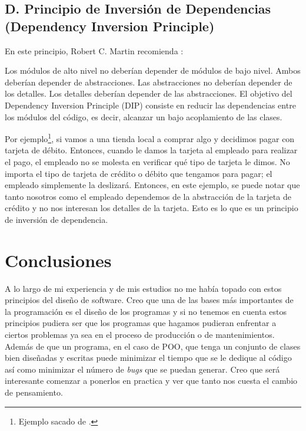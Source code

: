 \documentclass[12pt, oneside]{article}
\begin{document}
\subsection*{D. Principio de Inversión de Dependencias (Dependency Inversion Principle)}

\cite{martin2000design}

En este principio, Robert C. Martin recomienda\cite{singh2015effect} :

Los módulos de alto nivel no deberían depender de módulos de bajo nivel. Ambos deberían depender de abstracciones.
Las abstracciones no deberían depender de los detalles. Los detalles deberían depender de las abstracciones.
El objetivo del Dependency Inversion Principle (DIP) consiste en reducir las dependencias entre los módulos del código, es decir, alcanzar un bajo acoplamiento de las clases.

Por ejemplo\footnote{Ejemplo sacado de \cite{ejemplo_d}.}, si vamos a una tienda local a comprar algo y decidimos pagar con tarjeta de débito. Entonces, cuando le damos la tarjeta al empleado para realizar el pago, el empleado no se molesta en verificar qué tipo de tarjeta le dimos.
No importa el tipo de tarjeta de crédito o débito que tengamos para pagar; el empleado simplemente la deslizará. Entonces, en este ejemplo, se puede notar que tanto nosotros como el empleado dependemos de la abstracción de la tarjeta de crédito y no nos interesan los detalles de la tarjeta. Esto es lo que es un principio de inversión de dependencia.

\section*{Conclusiones}

A lo largo de mi experiencia y de mis estudios no me había topado con estos principios del diseño de software. Creo que una de las bases más importantes de la programación es el diseño de los programas y si no tenemos en cuenta estos principios pudiera ser que los programas que hagamos pudieran enfrentar a ciertos problemas ya sea en el proceso de producción o de mantenimientos. Además de que un programa, en el caso de POO, que tenga un conjunto de clases bien diseñadas y escritas puede minimizar el tiempo que se le dedique al código así como minimizar el número de {\it bugs} que se puedan generar.
Creo que será interesante comenzar a ponerlos en practica y ver que tanto nos cuesta el cambio de pensamiento.





\end{document}
